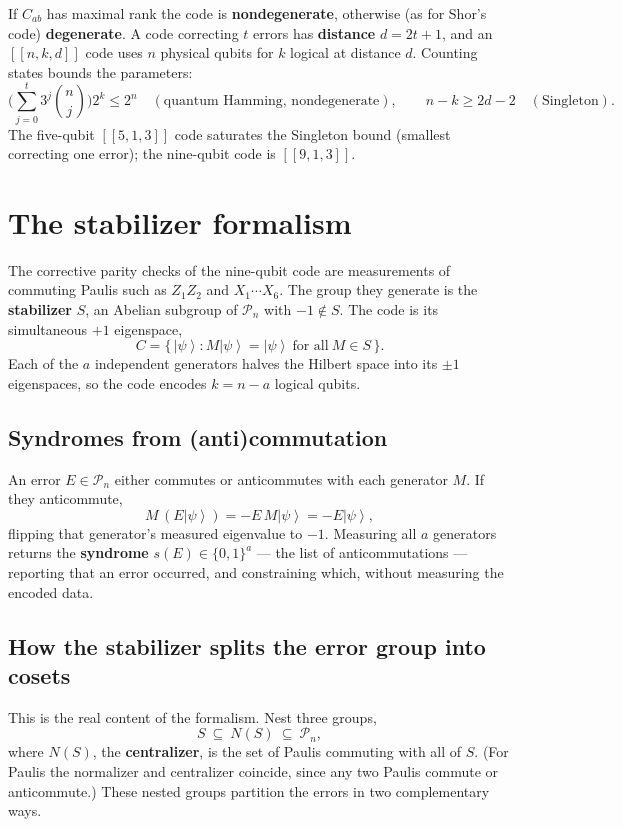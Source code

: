 \documentclass[11pt]{article}
\newcommand{\ket}[1]{\left|#1\right\rangle}
\theoremstyle{plain}
\begin{document}
\noindent If $C_{ab}$ has maximal rank the code is \textbf{nondegenerate}, otherwise (as for Shor's
code) \textbf{degenerate}. A code correcting $t$ errors has \textbf{distance} $d=2t+1$, and an
$[[n,k,d]]$ code uses $n$ physical qubits for $k$ logical at distance $d$. Counting states bounds the
parameters:
\[ \Big(\textstyle\sum_{j=0}^{t} 3^j\binom{n}{j}\Big)2^k \le 2^n
   \quad(\text{quantum Hamming, nondegenerate}),\qquad n-k \ge 2d-2 \quad(\text{Singleton}). \]
The five-qubit $[[5,1,3]]$ code saturates the Singleton bound (smallest correcting one error); the
nine-qubit code is $[[9,1,3]]$.

\section{The stabilizer formalism}
The corrective parity checks of the nine-qubit code are measurements of commuting Paulis such as
$Z_1Z_2$ and $X_1\cdots X_6$. The group they generate is the \textbf{stabilizer} $S$, an Abelian
subgroup of $\mathcal P_n$ with $-1\notin S$. The code is its simultaneous $+1$ eigenspace,
\[ C = \{\,\ket{\psi} : M\ket{\psi}=\ket{\psi}\ \text{for all}\ M\in S\,\}. \]
Each of the $a$ independent generators halves the Hilbert space into its $\pm1$ eigenspaces, so the
code encodes $k=n-a$ logical qubits.

\subsection*{Syndromes from (anti)commutation}
An error $E\in\mathcal P_n$ either commutes or anticommutes with each generator $M$. If they
anticommute,
\[ M\,(E\ket{\psi}) = -E\,M\ket{\psi} = -E\ket{\psi}, \]
flipping that generator's measured eigenvalue to $-1$. Measuring all $a$ generators returns the
\textbf{syndrome} $s(E)\in\{0,1\}^a$ --- the list of anticommutations --- reporting that an error
occurred, and constraining which, without measuring the encoded data.

\subsection*{How the stabilizer splits the error group into cosets}
This is the real content of the formalism. Nest three groups,
\[ S \ \subseteq\ N(S) \ \subseteq\ \mathcal P_n, \]
where $N(S)$, the \textbf{centralizer}, is the set of Paulis commuting with all of $S$. (For Paulis
the normalizer and centralizer coincide, since any two Paulis commute or anticommute.) These nested
groups partition the errors in two complementary ways.
\end{document}
